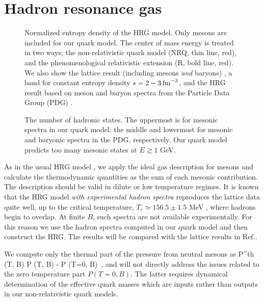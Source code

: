 \section{Hadron resonance gas }
\label{sec:HRG}

\begin{figure}
\caption{
Normalized entropy density of the HRG model. 
Only mesons are included for our quark model.
The center of mass energy is treated in two ways;
the non-relativistic quark model (NRQ, thin line, red), and the phenomenological relativistic extension (R, bold line, red).
We also show the lattice result (including mesons {\it and} baryons) \cite{Bali:2014kia}, a band for constant entropy density $s=2-3\, {\rm fm}^{-3}$,
and the HRG result based on meson and baryon spectra from the Particle Data Group (PDG) \cite{ParticleDataGroup:2020ssz}.
}
\label{fig:total_s_Bdep_B000}       %
\end{figure}

\begin{figure}
\begin{center}
\end{center}
\caption{
The number of hadronic states. 
The uppermost is for mesonic spectra in our quark model; the middle and lowermost for mesonic and baryonic spectra in the PDG, respectively.
Our quark model predicts too many mesonic states at $E \gtrsim 1$ GeV.
}
\label{fig:B0_histgram}       %
\end{figure}


As in the usual HRG model \cite{Karsch:2003vd}, we apply the ideal gas description for mesons and calculate
the thermodynamic quantities as the sum of each mesonic contribution.
The description should be valid in dilute or low temperature regimes. 
It is known that the HRG model {\it with experimental hadron spectra} reproduces the lattice data quite well, 
up to the critical temperature, $T_c\simeq 156.5\pm 1.5$ MeV \cite{HotQCD:2019xnw}, where hadrons begin to overlap.
At finite $B$, such spectra are not available experimentally.
For this reason we use the hadron spectra computed in our quark model and then construct the HRG.
The results will be compared with the lattice results in Ref.\cite{Bali:2014kia}.

We compute only the thermal part of the pressure from neutral mesons as
%
\beq
P^{\rm th} (T, B) \equiv P (T, B) - P (T=0, B) \,,
\eeq
%
and will not directly address the issues related to the zero temperature part $P (T=0, B)$.
The latter requires dynamical determination of the effective quark masses which
are inputs rather than outputs in our non-relativistic quark models.

